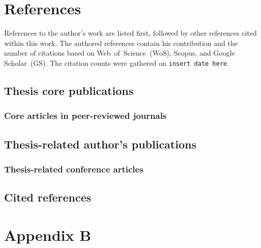 





\appendix
\renewcommand\chaptername{Appendix}


\chapter{References}

References to the author's work are listed first, followed by other references cited within this work.
The authored references contain his contribution and the number of citations based on Web~of~Science~(WoS), Scopus, and Google Scholar~(GS).
The citation counts were gathered on {\color{red} \texttt{insert date here}}.

\section{Thesis core publications}

\subsection*{Core articles in peer-reviewed journals}

\printbibliography[keyword={mine},keyword={phd_related},keyword={journal},keyword={core},notkeyword={submitted},heading=none,title={}]

\section{Thesis-related author's publications}

\subsection*{Thesis-related conference articles}

\printbibliography[keyword={mine},keyword={phd_related},keyword={conference},notkeyword={core},notkeyword={submitted},heading=none,title={}]

\section{Cited references}

\printbibliography[notkeyword=mine,heading=none,title={}]


\renewcommand{\thechapter}{B}
\renewcommand\chaptername{Appendix B}

\chapter{Appendix B}


